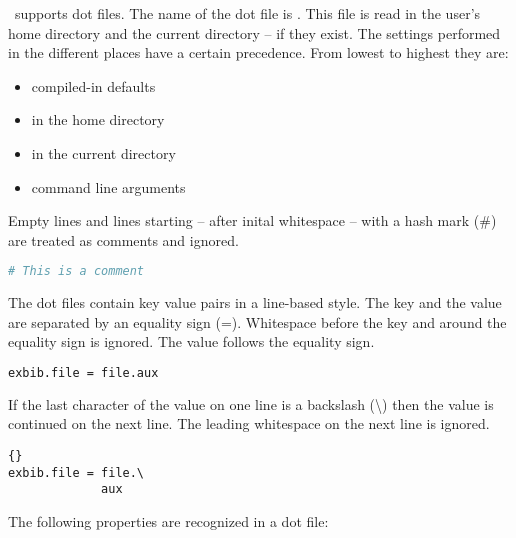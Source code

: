 \ExBib\ supports dot files. The name of the dot file is .
This file is read in the user's home directory and the current
directory -- if they exist. The settings performed in the different
places have a certain precedence. From lowest to highest they are:

\begin{itemize}
\item compiled-in defaults
\item {} in the home directory
\item {} in the current directory
\item command line arguments
\end{itemize}

Empty lines and lines starting -- after inital whitespace -- with a
hash mark (\#) are treated as comments and ignored.
\begin{lstlisting}[language=sh]
# This is a comment
\end{lstlisting}

The dot files contain key value pairs in a line-based style. The key
and the value are separated by an equality sign (=). Whitespace before
the key and around the equality sign is ignored. The value follows the
equality sign.
\begin{lstlisting}[language=sh]
exbib.file = file.aux
\end{lstlisting}

If the last character of the value on one line is a backslash
(\textbackslash) then the value is continued on the next line. The
leading whitespace on the next line is ignored.
\begin{lstlisting}{}
exbib.file = file.\
             aux
\end{lstlisting}

The following properties are recognized in a dot file:

